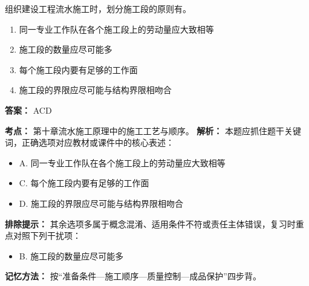 \documentclass[UTF8,fontset=fandol,11pt]{ctexart}
\begin{document}
\begin{quizbox}[title={第 21 题}]
组织建设工程流水施工时，划分施工段的原则有。\\
\begin{enumerate}[label=\Alph*.]
\item 同一专业工作队在各个施工段上的劳动量应大致相等
\item 施工段的数量应尽可能多
\item 每个施工段内要有足够的工作面
\item 施工段的界限应尽可能与结构界限相吻合
\end{enumerate}
\textbf{答案：} ACD
\vspace{0.25em}
\begin{answerbox}[title={考点解析}]
\textbf{考点：} 第十章流水施工原理中的施工工艺与顺序。
\textbf{解析：} 本题应抓住题干关键词，正确选项对应教材或课件中的核心表述：
\begin{itemize}
\item A. 同一专业工作队在各个施工段上的劳动量应大致相等
\item C. 每个施工段内要有足够的工作面
\item D. 施工段的界限应尽可能与结构界限相吻合
\end{itemize}
\textbf{排除提示：} 其余选项多属于概念混淆、适用条件不符或责任主体错误，复习时重点对照下列干扰项：
\begin{itemize}
\item B. 施工段的数量应尽可能多
\end{itemize}
\textbf{记忆方法：} 按“准备条件—施工顺序—质量控制—成品保护”四步背。
\end{answerbox}
\end{quizbox}

\vspace{0.2em}
\end{document}
